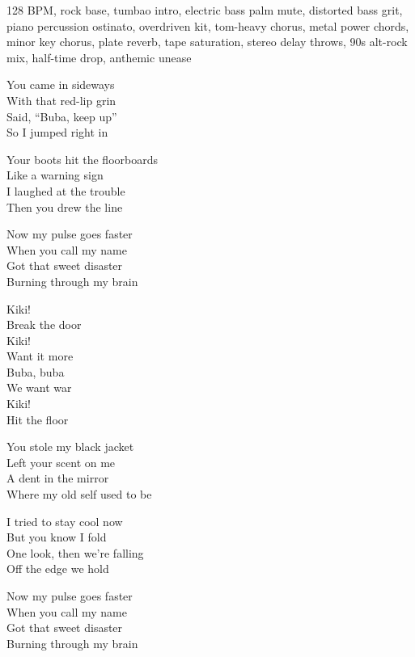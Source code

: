 

\begin{notes}
\end{notes}
\begin{style}
128 BPM, rock base, tumbao intro, electric bass palm mute, distorted bass grit, piano percussion ostinato, overdriven kit, tom-heavy chorus, metal power chords, minor key chorus, plate reverb, tape saturation, stereo delay throws, 90s alt-rock mix, half-time drop, anthemic unease
\end{style}
\begin{lyrics}
You came in sideways\\
With that red-lip grin\\
Said, “Buba, keep up”\\
So I jumped right in

Your boots hit the floorboards\\
Like a warning sign\\
I laughed at the trouble\\
Then you drew the line

Now my pulse goes faster\\
When you call my name\\
Got that sweet disaster\\
Burning through my brain

Kiki!\\
Break the door\\
Kiki!\\
Want it more\\
Buba, buba\\
We want war\\
Kiki!\\
Hit the floor

You stole my black jacket\\
Left your scent on me\\
A dent in the mirror\\
Where my old self used to be

I tried to stay cool now\\
But you know I fold\\
One look, then we’re falling\\
Off the edge we hold

Now my pulse goes faster\\
When you call my name\\
Got that sweet disaster\\
Burning through my brain


\end{lyrics}
